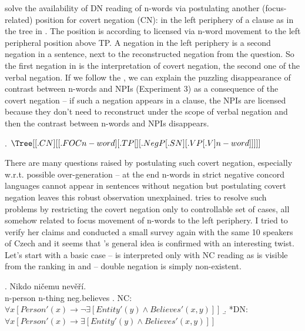 \documentclass[12pt]{scrartcl}
\begin{document}
\cite{fualuaus2016fragment} solve the availability of DN reading of n-words via postulating another (focus-related) position for covert negation (CN): in the left periphery of a clause as in the tree in \Next. The position is according to \cite{fualuaus2016fragment} licensed via n-word movement to the left peripheral position above TP. A negation in the left periphery is a second negation in a sentence, next to the reconstructed negation from the question. So the first negation in \Last[b] is the interpretation of covert negation, the second one of the verbal negation. If we follow the \cite{fualuaus2016fragment}, we can explain the puzzling disappearance of contrast between n-words and NPIs (Experiment 3) as a consequence of the covert negation -- if such a negation appears in a clause, the NPIs are licensed because they don't need to reconstruct under the scope of verbal negation and then the contrast between n-words and NPIs disappears.


\ex.
\(\Tree[[.CN ] [[.FOC n-word ][.TP [] [.NegP [. SN ] [.VP [.V ] n-word ]]]]]\)

There are many questions raised by postulating such covert negation, especially w.r.t. possible over-generation -- at the end n-words in strict negative concord languages cannot appear in sentences without negation but postulating covert negation leaves this robust observation unexplained. \cite{fualuaus2016fragment} tries to resolve such problems by restricting the covert negation only to controllable set of cases, all somehow related to focus movement of n-words to the left periphery. I tried to verify her claims and conducted a small survey again with the same 10 speakers of Czech and it seems that \citeauthor{fualuaus2016fragment}'s general idea is confirmed with an interesting twist. Let's start with a basic case -- \Next is interpreted only with NC reading as is visible from the ranking in \Next[a] and \Next[b] -- double negation is simply non-existent. 

\ex. Nikdo ničemu nevěří.\\
n-person n-thing neg.believes \a. NC:
\(\forall x[Person'(x) \rightarrow \neg \exists[Entity'(y) \wedge Believes'(x,y)]]\)
\b. *DN:
\(\forall x[Person'(x) \rightarrow \exists[Entity'(y) \wedge Believes'(x,y)]]\)
\end{document}

